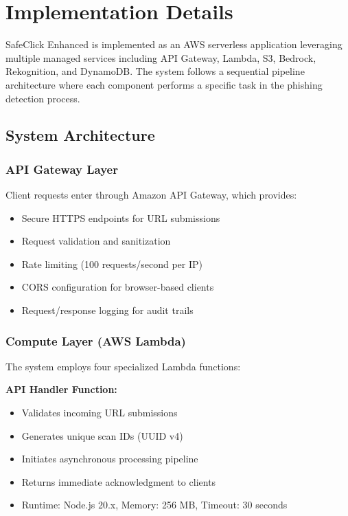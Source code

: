 \documentclass[conference]{IEEEtran}
\begin{document}
\section{Implementation Details}

SafeClick Enhanced is implemented as an AWS serverless application leveraging multiple managed services including API Gateway, Lambda, S3, Bedrock, Rekognition, and DynamoDB. The system follows a sequential pipeline architecture where each component performs a specific task in the phishing detection process.

\subsection{System Architecture}

\subsubsection{API Gateway Layer}

Client requests enter through Amazon API Gateway, which provides:
\begin{itemize}
\item Secure HTTPS endpoints for URL submissions
\item Request validation and sanitization
\item Rate limiting (100 requests/second per IP)
\item CORS configuration for browser-based clients
\item Request/response logging for audit trails
\end{itemize}


\subsubsection{Compute Layer (AWS Lambda)}

The system employs four specialized Lambda functions:

\textbf{API Handler Function:}
\begin{itemize}
\item Validates incoming URL submissions
\item Generates unique scan IDs (UUID v4)
\item Initiates asynchronous processing pipeline
\item Returns immediate acknowledgment to clients
\item Runtime: Node.js 20.x, Memory: 256 MB, Timeout: 30 seconds
\end{itemize}
\end{document}
